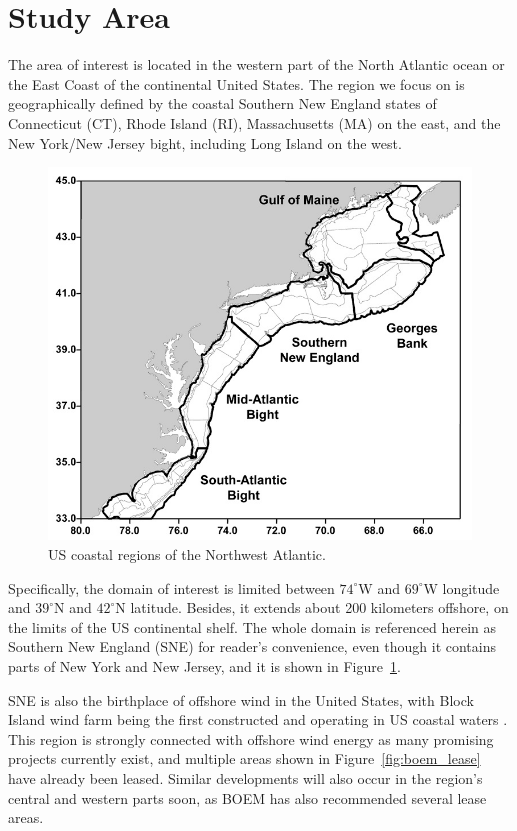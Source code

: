 \section{Study Area}\label{study_area}


The area of interest is located in the western part of the North Atlantic ocean or the East Coast of the continental United States. The region we focus on is geographically defined by the coastal Southern New England states of  Connecticut (CT), Rhode Island (RI), Massachusetts (MA) on the east, and the New York/New Jersey bight, including Long Island on the west. 


\begin{figure}[H]
\centering
\includegraphics[width=0.85\linewidth]{Figures/Chapter1/Northwest_Atlantic_coast.jpg}
\caption{US coastal regions of the Northwest Atlantic.}
\label{fig:northwest_atlantic}
\end{figure}

Specifically, the domain of interest is limited between $74^{\circ}$W and $69^{\circ}$W longitude and $39^{\circ}$N and $42^{\circ}$N latitude. Besides, it extends about 200 kilometers offshore, on the limits of the US continental shelf. 
The whole domain is referenced herein as Southern New England (SNE) for reader’s convenience, even though it contains parts of New York and New Jersey, and it is shown in Figure~\ref{fig:northwest_atlantic}.

SNE is also the birthplace of offshore wind in the United States, with Block Island wind farm being the first constructed and operating in US coastal waters \cite{Neill2018}. This region is strongly connected with offshore wind energy as many promising projects currently exist, and multiple areas shown in Figure~\ref{fig:boem_lease} have already been leased. Similar developments will also occur in the region's central and western parts soon, as BOEM has also recommended several lease areas.


